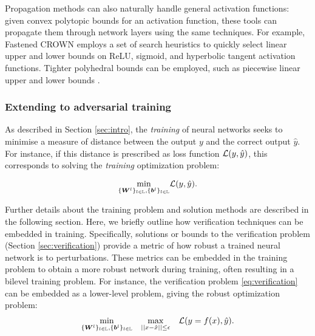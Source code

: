 Propagation methods \citep{singh2018fast,zhang2018efficient} can also naturally handle general activation functions: given convex polytopic bounds for an activation function, these tools can propagate them through network layers using the same techniques. 
For example, Fastened CROWN \citep{lyu2020fastened} employs a set of search heuristics to quickly select linear upper and lower bounds on ReLU, sigmoid, and hyperbolic tangent activation functions. 
Tighter polyhedral bounds can be employed, such as piecewise linear upper and lower bounds \citep{benussi2022individual}. %

\subsubsection{Extending to adversarial training} \label{sec:adversarialtraining}
As described in Section \ref{sec:intro}, the \emph{training} of neural networks seeks to minimise a measure of distance between the output $y$ and the correct output $\hat{y}$.
For instance, if this distance is prescribed as loss function $\mathcal{L}(y,\hat{y})$, this corresponds to solving the \emph{training} optimization problem: 

\begin{equation} \label{eq:training}
\underset{\{ {\bm{W}}^l \}_{l \in {\mathbb{L}}}, \{ {\bm{b}}^l \}_{l \in {\mathbb{L}}}}{\mathrm{min}} \mathcal{L}(y,\hat{y}).
\end{equation}

Further details about the training problem and solution methods are described in the following section. 
Here, we briefly outline how verification techniques can be embedded in training. 
Specifically, solutions or bounds to the verification problem (Section \ref{sec:verification}) provide a metric of how robust a trained neural network is to perturbations. These metrics can be embedded in the training problem to obtain a more robust network during training, often resulting in a bilevel training problem. For instance, the verification problem \eqref{eq:verification} can be embedded as a lower-level problem, giving the robust optimization problem:
\begin{align*}
\underset{\{ {\bm{W}}^l \}_{l \in {\mathbb{L}}}, \{ {\bm{b}}^l \}_{l \in {\mathbb{L}}}}{\mathrm{min}} \quad \underset{||x - \hat{x}|| \leq \epsilon}{\mathrm{max}} \quad \mathcal{L}(y=f(x),\hat{y}).
\end{align*}

